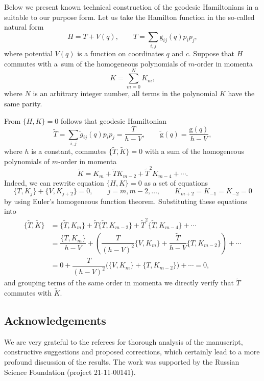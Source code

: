 \documentclass[10pt,a4paper]{amsart}
\numberwithin{equation}{section}
\begin{document}
Below we present known technical construction of the geodesic Hamiltonians in a suitable to our purpose form.
Let us take the Hamilton function in the so-called natural form
\[
H=T+V(q) ,\qquad T=\sum_{i,j} \mathrm g_{ij}(q) p_ip_j ,\]
where potential $V(q)$ is a function on coordinates $q$ and $c$. Suppose that $H$ commutes with a~sum of the homogeneous polynomials of $m$-order in momenta
\[K=\sum_{m=0}^N K_m,\]
where $N$ is an arbitrary integer number, all terms in the polynomial $K$ have the same parity.

From $\{H,K\}=0$ follows that geodesic Hamiltonian
\[\tilde{T}=\sum_{i,j}\tilde{g}_{ij}(q) p_ip_j=\dfrac{T}{h-V} ,\qquad \tilde{\mathrm g}(q)=\frac{\mathrm g(q)}{h-V},\]
where $h$ is a constant, commutes $\big\{\tilde{T},\tilde{K}\big\}=0$ with a sum of the homogeneous polynomials of $m$-order in momenta
\[
\tilde{K}=K_m+\tilde{T}K_{m-2}+\tilde{T}^2K_{m-4}+\cdots .
\]
Indeed, we can rewrite equation $\{H,K\}=0$ as a set of equations
\[
\{ T,K_j \}+\{V,K_{j+2}\}=0 ,\qquad j=m,m-2,\dots ,\qquad K_{m+2}=K_{-1}=K_{-2}=0
\]
by using Euler's homogeneous function theorem.
Substituting these equations into
\begin{align*}
\big\{\tilde{T},\tilde{K}\big\}&= \big\{\tilde{T},K_m\big\}+\tilde{T}\big\{\tilde{T},K_{m-2}\big\}+\tilde{T}^2\big\{\tilde{T},K_{m-4}\big\}+\cdots \\
&= \dfrac{\{T,K_m\}}{h-V}+\left(\dfrac{T}{(h-V)^2}\{V,K_m\}+\dfrac{\tilde{T}}{h-V}\{T,K_{m-2}\}\right)+\cdots \\
&= 0 +\dfrac{T}{(h-V)^2}\big(\{V,K_m\}+\{T,K_{m-2}\}\big)+\cdots=0 ,
\end{align*}
and grouping terms of the same order in momenta we directly verify that $\tilde{T}$ commutes with $\tilde{K}$.

\subsection*{Acknowledgements}
We are very grateful to the referees for thorough analysis of the manuscript, constructive suggestions and proposed corrections, which certainly lead to a more profound discussion of the results.
The work was supported by the Russian Science Foundation (project 21-11-00141).
\end{document}
